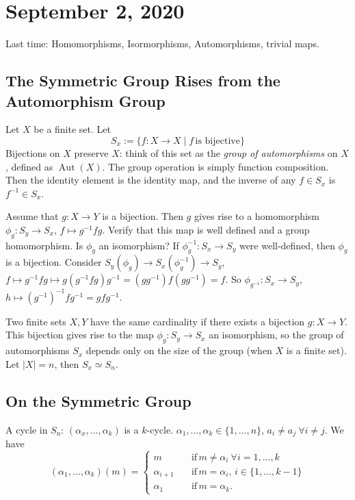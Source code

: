 \section{September 2, 2020}
Last time: Homomorphisms, Isormorphisms, Automorphisms, trivial maps.
\subsection{The Symmetric Group Rises from the Automorphism Group}
\begin{example}
    Let $X$ be a finite set. Let \[
        S_x := \{ f \colon X \to X  \mid f \, \text{is bijective}\} 
    \]
    Bijections on $X$ preserve $X$: think of this set as the \emph{group of automorphisms} on $X$, defined as $\operatorname{Aut}(X)$. The group operation is simply function composition. Then the identity element is the identity map, and the inverse of any $f\in S_x$ is $f^{-1}\in S_x$.
\end{example}
Assume that $ g \colon X \to Y$ is a bijection. Then $g$ gives rise to a homomorphism $ \phi_g \colon S_y \to S_x$, $f \mapsto g^{-1}fg$. Verify that this map is well defined and a group homomorphism. Is $\phi_g$ an isomorphism? If $\phi_g^{-1} \colon S_x \to S_y$ were well-defined, then $\phi_g$ is a bijection. Consider $S_y (\phi_g) \to S_x (\phi_g^{-1}) \to S_y$, $f \mapsto g^{-1}fg \mapsto g(g^{-1}fg)g^{-1}=(gg^{-1})f(gg^{-1})=f$. So $\phi_{g^{-1}} \colon S_{x} \to S_{y}$, $h \mapsto (g^{-1})^{-1}fg^{-1}=gfg^{-1}$.

\begin{conclusion}
    Two finite sets $X,Y$ have the same cardinality if there exists a bijection $ g \colon X \to Y$. This bijection gives rise to the map $ \phi_g \colon S_y \to S_x$ an isomorphism, so the group of automorphisms $S_x$ depends only on the size of the group (when $X$ is a finite set). Let $|X|=n$, then $S_x \simeq S_n$.
\end{conclusion}

\subsection{On the Symmetric Group}
A cycle in $S_n$: $(\alpha_x , ... , \alpha_k)$ is a $k$-cycle. $\alpha_1 ,...,\alpha_k \in \{1, ...,n\} $, $a_i \neq a_j \ \forall i \neq j$. We have  
\begin{equation*}
    (\alpha_1,...,\alpha_k)(m) = 
\begin{cases}
    m \quad &\mbox{if}\, m \neq \alpha_i \ \forall i=1,...,k\\
    \alpha_{i+1} \quad &\mbox{if} \, m=\alpha_i, \, i\in \{1,...,k-1\} \\
    \alpha_1 \quad &\mbox{if} \, m=\alpha_k.

\end{cases}
\end{equation*}

